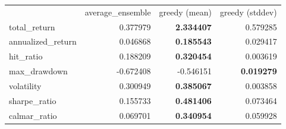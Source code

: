 \begin{tabular}{lrrr}
 & average_ensemble & greedy (mean) & greedy (stddev) \\
total_return & 0.377979 & \bfseries 2.334407 & 0.579285 \\
annualized_return & 0.046868 & \bfseries 0.185543 & 0.029417 \\
hit_ratio & 0.188209 & \bfseries 0.320454 & 0.003619 \\
max_drawdown & -0.672408 & -0.546151 & \bfseries 0.019279 \\
volatility & 0.300949 & \bfseries 0.385067 & 0.003858 \\
sharpe_ratio & 0.155733 & \bfseries 0.481406 & 0.073464 \\
calmar_ratio & 0.069701 & \bfseries 0.340954 & 0.059928 \\
\end{tabular}
